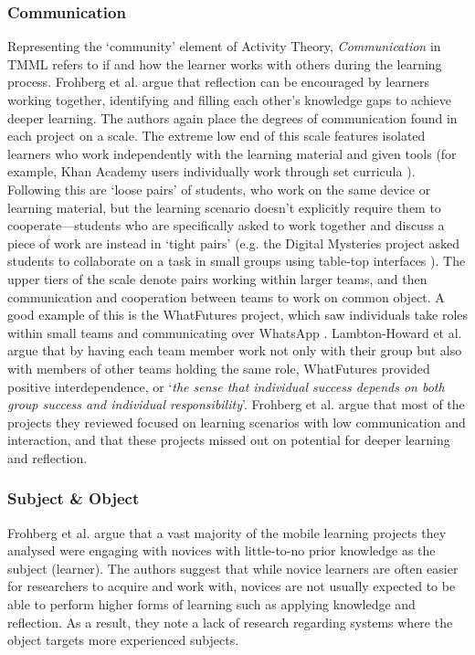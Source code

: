 \subsubsection{Communication}
Representing the `community' element of Activity Theory, \textit{Communication} in TMML refers to if and how the learner works with others during the learning process. Frohberg et al. argue that reflection can be encouraged by learners working together, identifying and filling each other's knowledge gaps to achieve deeper learning. The authors again place the degrees of communication found in each project on a scale. The extreme low end of this scale features isolated learners who work independently with the learning material and given tools (for example, Khan Academy users individually work through set curricula \citep{Khan2011}). Following this are `loose pairs' of students, who work on the same device or learning material, but the learning scenario doesn't explicitly require them to cooperate---students who are specifically asked to work together and discuss a piece of work are instead in `tight pairs' (e.g. the Digital Mysteries project asked students to collaborate on a task in small groups using table-top interfaces \citep{Kharrufa2010}). The upper tiers of the scale denote pairs working within larger teams, and then communication and cooperation between teams to work on common object. A good example of this is the WhatFutures project, which saw individuals take roles within small teams and communicating over WhatsApp \citep{Howard2019}. Lambton-Howard et al. argue that by having each team member work not only with their group but also with members of other teams holding the same role, WhatFutures provided positive interdependence, or `\textit{the sense that individual success depends on both group success and individual responsibility}'. Frohberg et al. argue that most of the projects they reviewed focused on learning scenarios with low communication and interaction, and that these projects missed out on potential for deeper learning and reflection.

\subsubsection{Subject \& Object}
Frohberg et al. argue that a vast majority of the mobile learning projects they analysed were engaging with novices with little-to-no prior knowledge as the subject (learner). The authors suggest that while novice learners are often easier for researchers to acquire and work with, novices are not usually expected to be able to perform higher forms of learning such as applying knowledge and reflection. As a result, they note a lack of research regarding systems where the object targets more experienced subjects.


